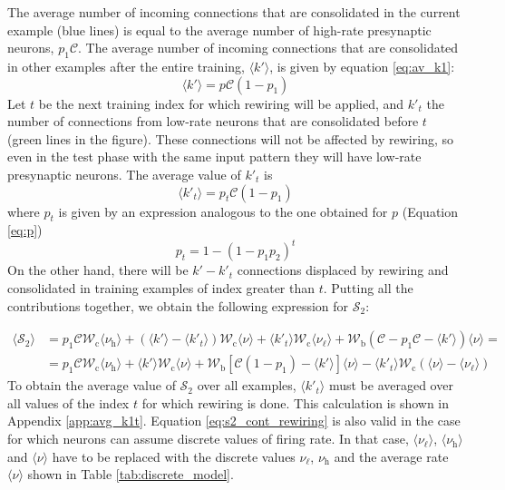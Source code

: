 \documentclass[a4paper, 12pt, twoside, openright]{book}
\newcommand{\rh}{\nu_\text{h}}
\newcommand{\rl}{\nu_{\ell}}
\newcommand{\C}{\mathcal{C}}
\newcommand{\Wb}{\mathcal{W}_\text{b}}
\newcommand{\Wc}{\mathcal{W}_\text{c}}
\newcommand{\SII}{\mathcal{S}_\text{2}}
\begin{document}
The average number of incoming connections that are consolidated in the current example (blue lines) is equal to the average number of high-rate presynaptic neurons,
$p_1 \C$.
The average number of incoming connections that are consolidated in other examples after the entire training,
$\langle k' \rangle$, is given by equation \eqref{eq:av_k1}:
\begin{equation}
    \langle k' \rangle = p \C(1-p_1)
\end{equation}
Let $t$ be the next training index for which rewiring will be applied, and $k'_t$ the number of connections from low-rate neurons that are consolidated before $t$ (green lines in the figure).
These connections will not be affected by rewiring, so even in the test phase with the same input pattern they will have low-rate presynaptic neurons.
The average value of $k'_t$ is
\begin{equation}
\label{eq:avg_k1t}
\langle k'_t \rangle = p_t \C ( 1 - p_1 )
\end{equation}
where $p_t$ is given by an expression analogous to the one obtained for $p$ (Equation \eqref{eq:p})
\begin{equation}
\label{eq:pt}
p_t = 1 - (1 - p_1 p_2)^t
\end{equation}
On the other hand, there will be $k' - k'_t$ connections displaced by rewiring and consolidated in training examples of index greater than $t$.
Putting all the contributions together, we obtain the following expression for $\SII$:

\begin{equation}
\label{eq:s2_cont_rewiring}
\begin{split}
    \langle \SII \rangle &=
    p_1 \C \Wc \langle \rh \rangle +
    ( \langle k' \rangle - \langle k'_t \rangle )
    \Wc \langle \nu \rangle
    + \langle k'_t \rangle \Wc \langle \rl \rangle
    + \Wb (\C - p_1 \C - \langle k' \rangle)
    \langle \nu \rangle =\\
    &= p_1 \C \Wc \langle \rh \rangle +
    \langle k' \rangle \Wc \langle \nu \rangle +
    \Wb [ \C (1 - p_1) - \langle k' \rangle ]
    \langle \nu \rangle
    - \langle k'_t \rangle \Wc
    ( \langle \nu \rangle - \langle \rl \rangle )
\end{split}
\end{equation}
To obtain the average value of $\SII$ over all examples, $\langle k'_t \rangle$ must be averaged over all values of the index $t$ for which rewiring is done.
This calculation is shown in Appendix \ref{app:avg_k1t}.
Equation \eqref{eq:s2_cont_rewiring} is also valid in the case for which neurons can assume discrete values of firing rate. In that case, $\langle \rl \rangle$, $\langle \rh \rangle$ and $\langle \nu \rangle$ have to be replaced with the discrete values $\rl$, $\rh$ and the average rate $\langle \nu \rangle$ shown in Table \ref{tab:discrete_model}.
\end{document}
